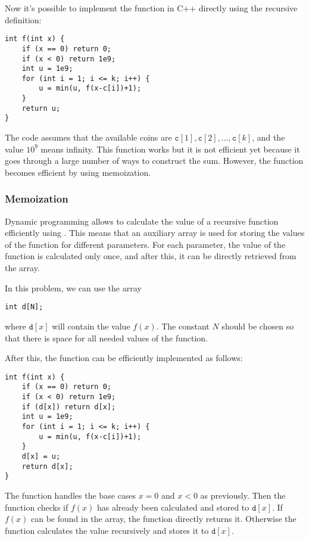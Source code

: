 Now it's possible to implement the function in C++
directly using the recursive definition:

\begin{lstlisting}
int f(int x) {
    if (x == 0) return 0;
    if (x < 0) return 1e9;
    int u = 1e9;
    for (int i = 1; i <= k; i++) {
        u = min(u, f(x-c[i])+1);
    }
    return u;
}
\end{lstlisting}

The code assumes that the available coins are
$\texttt{c}[1], \texttt{c}[2], \ldots, \texttt{c}[k]$,
and the value $10^9$ means infinity.
This function works but it is not efficient yet
because it goes through a large number
of ways to construct the sum.
However, the function becomes efficient by
using memoization.

\subsubsection{Memoization}


Dynamic programming allows to calculate the
value of a recursive function efficiently
using .
This means that an auxiliary array is used
for storing the values of the function
for different parameters.
For each parameter, the value of the function
is calculated only once, and after this,
it can be directly retrieved from the array.

In this problem, we can use the array
\begin{lstlisting}
int d[N];
\end{lstlisting}

where $\texttt{d}[x]$ will contain
the value $f(x)$.
The constant $N$ should be chosen so
that there is space for all needed
values of the function.

After this, the function can be efficiently
implemented as follows:

\begin{lstlisting}
int f(int x) {
    if (x == 0) return 0;
    if (x < 0) return 1e9;
    if (d[x]) return d[x];
    int u = 1e9;
    for (int i = 1; i <= k; i++) {
        u = min(u, f(x-c[i])+1);
    }
    d[x] = u;
    return d[x];
}
\end{lstlisting}

The function handles the base cases
$x=0$ and $x<0$ as previously.
Then the function checks if
$f(x)$ has already been calculated
and stored to $\texttt{d}[x]$.
If $f(x)$ can be found in the array,
the function directly returns it.
Otherwise the function calculates the value
recursively and stores it to $\texttt{d}[x]$.

